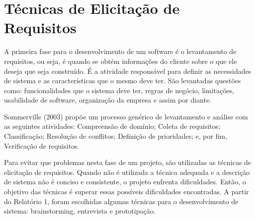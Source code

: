 \chapter[Técnicas de Elicitação de Requisitos]{Técnicas de Elicitação de Requisitos}
A primeira fase para o desenvolvimento de um software é o levantamento de requisitos, ou seja, é quando se obtém informações do cliente sobre o que ele deseja que seja construído. É a atividade responsável para definir as necessidades de sistema e as características que o mesmo deve ter. São levantadas questões como: funcionalidades que o sistema deve ter, regras de negócio, limitações, usabilidade de software, organização da empresa e assim por diante.

Sommerville (2003) propõe um processo genérico de levantamento e análise com as seguintes atividades: Compreensão de domínio; Coleta de requisitos; Classificação; Resolução de conflitos; Definição de prioridades; e, por fim, Verificação de requisitos.

Para evitar que problemas nesta fase de um projeto, são utilizadas as técnicas de elicitação de requisitos. Quando não é utilizada a técnica adequada e a descrição de sistema não é conciso e consistente, o projeto enfrenta dificuldades. Então, o objetivo das técnicas é superar essas possíveis dificuldades encontradas.
A partir do Relatório 1, foram escolhidas algumas técnicas para o desenvolvimento de sistema: brainstorming, entrevista e prototipação.
